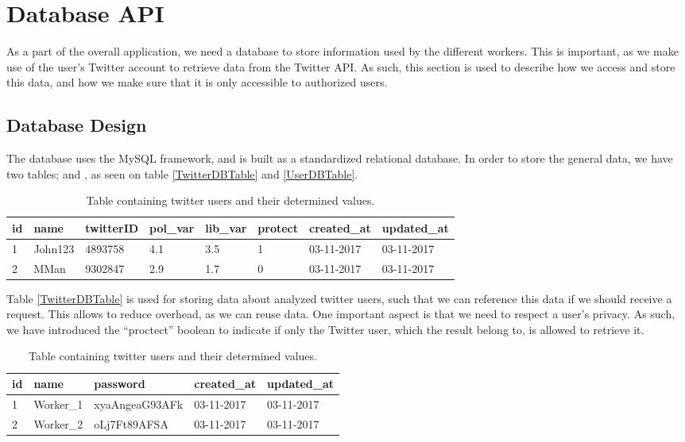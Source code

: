 \chapter{Database \ac{API}}
As a part of the overall application, we need a database to store information
used by the different workers. This is important, as we make use of the
user's Twitter account to retrieve data from the Twitter \ac{API}. As such, this
section is used to describe how we access and store this data, and how we
make sure that it is only accessible to authorized users.

\section{Database Design}\label{DBDesign}
The database uses the MySQL framework, and is built as a standardized relational
database. In order to store the general data, we have two tables; 
and , as seen on table \autoref{TwitterDBTable}
and \autoref{UserDBTable}.

\begin{table}[H]
\begin{tabular}{l | l | l | l | l | l | l | l	}
\textbf{id} & \textbf{name} & \textbf{twitterID} & \textbf{pol\_var} &
\textbf{lib\_var} & \textbf{protect} & \textbf{created\_at} & \textbf{updated\_at}
\\\hline 1 & John123 & 4893758 & 4.1 & 3.5 & 1 & 03-11-2017 & 03-11-2017 
\\\hline 2 & MMan & 9302847 & 2.9 & 1.7 & 0 & 03-11-2017 & 03-11-2017 
\\\hline
\end{tabular}
\caption{Table containing twitter users and their determined values.}
\label{TwitterDBTable}
\end{table}

Table \autoref{TwitterDBTable} is used for storing data about analyzed
twitter users, such that we can reference this data if we should receive
a request. This allows to reduce overhead, as we can reuse data. One important
aspect is that we need to respect a user's privacy. As such, we have introduced
the ``proctect'' boolean to indicate if only the Twitter user, which the result
belong to, is allowed to retrieve it.

\begin{table}[H]
\begin{tabular}{l | l | l | l | l }
\textbf{id} & \textbf{name} & \textbf{password} &
\textbf{created\_at} & \textbf{updated\_at}\\\hline
1 & Worker\_1 & xyaAngeaG93AFk & 03-11-2017 & 03-11-2017
\\\hline
2 & Worker\_2 & oLj7Ft89AFSA & 03-11-2017 & 03-11-2017 \\\hline
\end{tabular}
\caption{Table containing twitter users and their determined values.}
\label{UserDBTable}
\end{table}

